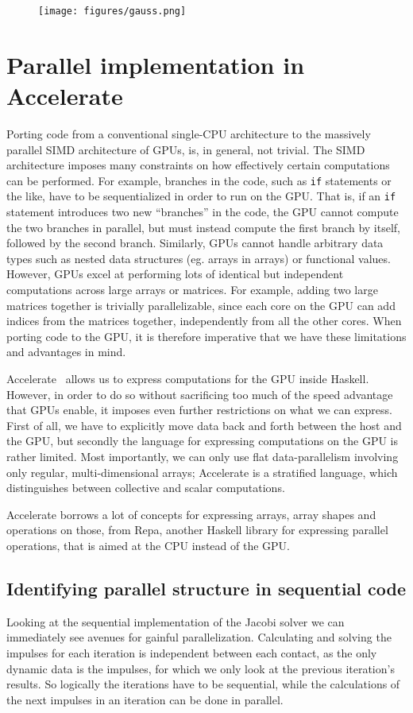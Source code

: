 \documentclass[runningheads,a4paper]{llncs}
\begin{document}
\begin{figure}
  \centering
  \texttt{[image: figures/gauss.png]}
  \caption{}
  \label{fig:gauss}
\end{figure}

\section{Parallel implementation in Accelerate\label{parjacobi}}
Porting code from a conventional single-CPU architecture to the massively
parallel SIMD architecture of GPUs, is, in general, not trivial. The SIMD
architecture imposes many constraints on how effectively certain computations
can be performed. For example, branches in the code, such as \verb+if+
statements or the like, have to be sequentialized in order to run on the
GPU. That is, if an \verb+if+ statement introduces two new ``branches'' in the
code, the GPU cannot compute the two branches in parallel, but must instead
compute the first branch by itself, followed by the second branch. Similarly,
GPUs cannot handle arbitrary data types such as nested data structures
(eg. arrays in arrays) or functional values. However, GPUs excel at performing
lots of identical but independent computations across large arrays or
matrices. For example, adding two large matrices together is trivially
parallelizable, since each core on the GPU can add indices from the matrices
together, independently from all the other cores. When porting code to the GPU,
it is therefore imperative that we have these limitations and advantages in
mind.

Accelerate~\cite{acc} allows us to express computations for the GPU inside
Haskell. However, in order to do so without sacrificing too much of the speed
advantage that GPUs enable, it imposes even further restrictions on what we can
express. First of all, we have to explicitly move data back and forth between
the host and the GPU, but secondly the language for expressing computations on
the GPU is rather limited. Most importantly, we can only use flat
data-parallelism involving only regular, multi-dimensional arrays; Accelerate
is a stratified language, which distinguishes between collective and scalar
computations.

Accelerate borrows a lot of concepts for expressing arrays, array shapes and
operations on those, from Repa\cite{repa}, another Haskell library for expressing parallel
operations, that is aimed at the CPU instead of the GPU.

\subsection{Identifying parallel structure in sequential code\label{identpara}}
Looking at the sequential implementation
of the Jacobi solver
we can immediately see avenues for gainful parallelization.
Calculating and solving the impulses
for each iteration is independent between each contact,
as the only dynamic data is the impulses,
for which we only look at the previous iteration's results.
So logically the iterations have to be sequential,
while the calculations of the next impulses in an iteration
can be done in parallel.
\end{document}
